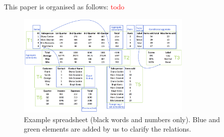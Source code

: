 \documentclass{sig-alternate-05-2015}
\newcommand{\luc}[1]{{\textcolor{red}{#1}}}
\begin{document}
This paper is organised as follows: \luc{todo}




\begin{figure}[tbh]
  \begin{center}
    \includegraphics[width=0.75\textwidth]{figures/Demo.png}
  \end{center}
  \vspace{-10pt}
  \caption{Example spreadsheet (black words and numbers only). Blue and green elements are added by us to clarify the relations.}
  \label{fig:main_example}
\end{figure}
\end{document}
